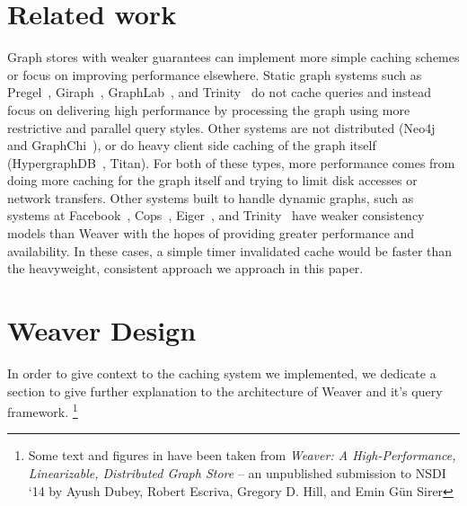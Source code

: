 \documentclass[letterpaper,twocolumn,11pt,tight]{article}
\begin{document}
\section{Related work}\label{sec:related}
Graph stores with weaker guarantees can implement more simple caching schemes or focus on improving performance elsewhere.
Static graph systems such as Pregel~\cite{pregel}, Giraph~\cite{giraph}, GraphLab~\cite{powergraph}, and Trinity~\cite{trinity} do not cache queries and instead focus on delivering high performance by processing the graph using more restrictive and parallel query styles. %
Other systems are not distributed (Neo4j~\cite{neo4j} and GraphChi~\cite{graphchi}), or do heavy client side caching of the graph itself (HypergraphDB~\cite{hypergraphdb}, Titan\cite{titan,titan_slides}).
For both of these types, more performance comes from doing more caching for the graph itself and trying to limit disk accesses or network transfers.
Other systems built to handle dynamic graphs, such as systems at Facebook~\cite{tao,memcache_fb}, Cops~\cite{cops}, Eiger~\cite{eiger}, and Trinity~\cite{trinity} have weaker consistency models than Weaver with the hopes of providing greater performance and availability.
In these cases, a simple timer invalidated cache would be faster than the heavyweight, consistent approach we approach in this paper.

\section{Weaver Design}\label{sec:wdesign}
In order to give context to the caching system we implemented, we dedicate a section to give further explanation to the architecture of Weaver and it's query framework.
\footnote{Some text and figures in  have been taken from \emph{Weaver: A High-Performance, Linearizable, Distributed Graph Store} -- an unpublished submission to NSDI `14 by Ayush Dubey, Robert Escriva, Gregory D. Hill, and Emin G\"un Sirer}
\end{document}
